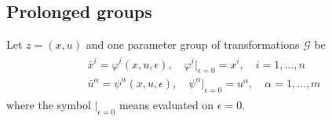 \subsection{ Prolonged groups}
Let $ z= (x,u)$ and one parameter group of transformations $\mathcal{G}$  be \begin{align}
\begin{aligned}
\bar{x}^i = \varphi^i(x,u,\epsilon ), \quad \varphi^i|_{\epsilon=0} = x^i, \quad i =1,\ldots,n\\
\bar{u}^{\alpha } =\psi^{\alpha}(x,u,\epsilon),\quad \psi^{\alpha}|_{\epsilon=0} = u^{\alpha }, \quad \alpha =1,\ldots,m
\end{aligned} \label{2.3.1}
\end{align} where the symbol $|_{\epsilon=0} $ means evaluated on $\epsilon=0 $.

